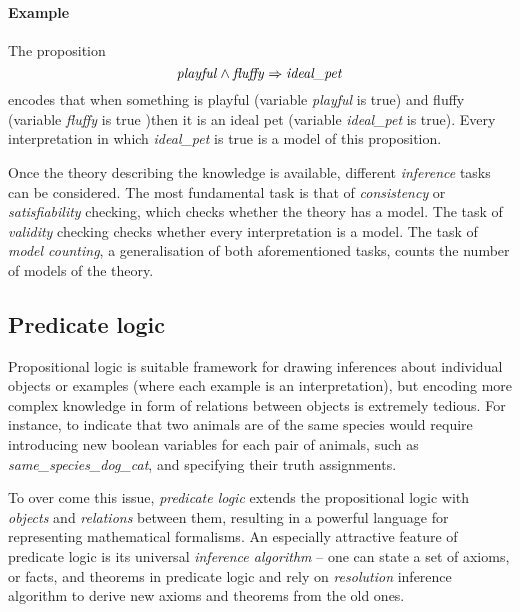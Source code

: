 \paragraph{Example} The proposition
$$\text{\textit{playful}} \wedge \text{\textit{fluffy}} \Rightarrow \text{\textit{ideal\_pet}} $$
encodes that when something is playful (variable \textit{playful} is true) and fluffy (variable \textit{fluffy} is true )then it is an ideal pet (variable \textit{ideal\_pet} is true).
Every interpretation in which \textit{ideal\_pet} is true is a model of this proposition.




Once the theory describing the knowledge is available, different \textit{inference} tasks can be considered.
The most fundamental task is that of \textit{consistency} or \textit{satisfiability} checking, which checks whether the theory has a model.
The task of \textit{validity} checking checks whether every interpretation is a model.
The task of \textit{model counting}, a generalisation of both aforementioned tasks, counts the number of models of the theory.









\subsection{Predicate logic}


Propositional logic is suitable framework for drawing inferences about individual objects or examples (where each example is an interpretation), but encoding more complex knowledge in form of relations between objects is extremely tedious.
For instance, to indicate that two animals are of the same species would require introducing new boolean variables for each pair of animals, such as \textit{same\_species\_dog\_cat}, and specifying their truth assignments.



To over come this issue, \textit{predicate logic} extends the propositional logic with \textit{objects} and \textit{relations} between them, resulting in a powerful language for representing mathematical formalisms.
An especially attractive feature of predicate logic is its universal \textit{inference algorithm} -- one can state a set of axioms, or facts, and theorems in predicate logic and rely on \textit{resolution} \cite{Robinson:1965:Resolution} inference algorithm to derive new axioms and theorems from the old ones.



